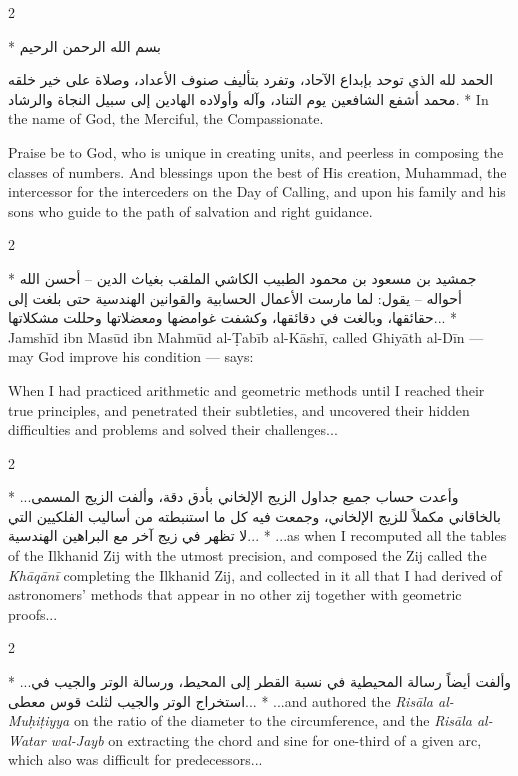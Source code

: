 \documentclass[11pt,a4paper]{article}
\newcommand{\ar}[1]{\arabicfont\beginR #1\endR}
\newenvironment{bilingual}{%
  \vspace{0.3em}%
  \begin{paracol}{2}%
}{%
  \end{paracol}%
  \vspace{0.3em}%
}
\begin{document}
\begin{bilingual}
\switchcolumn[0]*
\ar{بسم الله الرحمن الرحيم}

\ar{الحمد لله الذي توحد بإبداع الآحاد، وتفرد بتأليف صنوف الأعداد، وصلاة على خير خلقه محمد أشفع الشافعين يوم التناد، وآله وأولاده الهادين إلى سبيل النجاة والرشاد.}
\switchcolumn[1]*
In the name of God, the Merciful, the Compassionate.

Praise be to God, who is unique in creating units, and peerless in
composing the classes of numbers. And blessings upon the best of His
creation, Muhammad, the intercessor for the interceders on the Day of
Calling, and upon his family and his sons who guide to the path of
salvation and right guidance.
\end{bilingual}

\begin{bilingual}
\switchcolumn[0]*
\ar{جمشيد بن مسعود بن محمود الطبيب الكاشي الملقب بغياث الدين -- أحسن الله أحواله -- يقول: لما مارست الأعمال الحسابية والقوانين الهندسية حتى بلغت إلى حقائقها، وبالغت في دقائقها، وكشفت غوامضها ومعضلاتها وحللت مشكلاتها...}
\switchcolumn[1]*
Jamsh\=id ibn Mas\=ud ibn Mahm\=ud al-\d{T}ab\=ib al-K\=ash\=i, called
Ghiy\=ath al-D\=in --- may God improve his condition --- says:

When I had practiced arithmetic and geometric methods until I reached
their true principles, and penetrated their subtleties, and uncovered
their hidden difficulties and problems and solved their challenges...
\end{bilingual}

\begin{bilingual}
\switchcolumn[0]*
\ar{...وأعدت حساب جميع جداول الزيج الإلخاني بأدق دقة، وألفت الزيج المسمى بالخاقاني مكملاً للزيج الإلخاني، وجمعت فيه كل ما استنبطته من أساليب الفلكيين التي لا تظهر في زيج آخر مع البراهين الهندسية...}
\switchcolumn[1]*
...as when I recomputed all the tables of the Ilkhanid Zij with the utmost precision,
and composed the Zij called the \textit{Kh\=aq\=an\=i} completing the Ilkhanid
Zij, and collected in it all that I had derived of astronomers' methods
that appear in no other zij together with geometric proofs...
\end{bilingual}

\begin{bilingual}
\switchcolumn[0]*
\ar{...وألفت أيضاً رسالة المحيطية في نسبة القطر إلى المحيط، ورسالة الوتر والجيب في استخراج الوتر والجيب لثلث قوس معطى...}
\switchcolumn[1]*
...and authored the \textit{Ris\=ala al-Mu\d{h}i\d{t}iyya} on the ratio of
the diameter to the circumference, and the \textit{Ris\=ala al-Watar
wal-Jayb} on extracting the chord and sine for one-third of a given
arc, which also was difficult for predecessors...
\end{bilingual}
\end{document}
